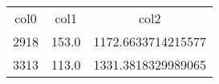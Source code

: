 \begin{table}
\begin{tabular}{ccc}
col0 & col1 & col2 \\
2918 & 153.0 & 1172.6633714215577 \\
3313 & 113.0 & 1331.3818329989065 \\
\end{tabular}
\end{table}
